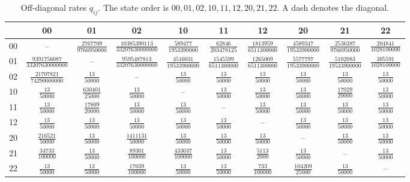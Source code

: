 \documentclass[11pt]{article}
\begin{document}
\begin{table}[ht]
\centering
\small
\setlength{\tabcolsep}{3.2pt}
\renewcommand{\arraystretch}{1.25}
\caption{Off-diagonal rates $q_{ij}$.  The state order is
$00,01,02,10,11,12,20,21,22$.  A dash denotes the diagonal.}
\label{tab:Q}
\begin{tabular}{c|ccccccccc}
\toprule
 &00&01&02&10&11&12&20&21&22\\
\midrule
00 &--&$\frac{2767709}{9766950000}$&$\frac{10385390113}{33207630000000}$&$\frac{589477}{1953390000}$&$\frac{62846}{203478125}$&$\frac{1813959}{6511300000}$&$\frac{4589347}{19533900000}$&$\frac{2536387}{9766950000}$&$\frac{204841}{1028100000}$\\
01 &$\frac{9391756087}{33207630000000}$&--&$\frac{9595487813}{33207630000000}$&$\frac{4516031}{19533900000}$&$\frac{1545599}{6511300000}$&$\frac{1265009}{6511300000}$&$\frac{5577797}{19533900000}$&$\frac{5102083}{19533900000}$&$\frac{305591}{1028100000}$\\
02 &$\frac{21707821}{74290000000}$&$\frac{13}{50000}$&--&$\frac{13}{50000}$&$\frac{13}{50000}$&$\frac{13}{50000}$&$\frac{13}{50000}$&$\frac{13}{50000}$&$\frac{13}{50000}$\\
10 &$\frac{13}{50000}$&$\frac{630401}{25000}$&$\frac{13}{50000}$&--&$\frac{13}{50000}$&$\frac{13}{50000}$&$\frac{13}{50000}$&$\frac{17029}{20000}$&$\frac{13}{50000}$\\
11 &$\frac{13}{50000}$&$\frac{17809}{20000}$&$\frac{13}{50000}$&$\frac{13}{50000}$&--&$\frac{13}{50000}$&$\frac{13}{50000}$&$\frac{13}{50000}$&$\frac{13}{50000}$\\
12 &$\frac{13}{50000}$&$\frac{13}{50000}$&$\frac{13}{50000}$&$\frac{13}{50000}$&$\frac{13}{50000}$&--&$\frac{13}{50000}$&$\frac{13}{50000}$&$\frac{13}{50000}$\\
20 &$\frac{216521}{50000}$&$\frac{13}{50000}$&$\frac{1411131}{50000}$&$\frac{13}{50000}$&$\frac{13}{50000}$&$\frac{13}{50000}$&--&$\frac{13}{50000}$&$\frac{13}{50000}$\\
21 &$\frac{34733}{100000}$&$\frac{13}{50000}$&$\frac{89301}{100000}$&$\frac{433037}{100000}$&$\frac{13}{50000}$&$\frac{5113}{2000}$&$\frac{13}{50000}$&--&$\frac{13}{50000}$\\
22 &$\frac{13}{50000}$&$\frac{13}{50000}$&$\frac{17039}{100000}$&$\frac{13}{50000}$&$\frac{13}{50000}$&$\frac{733}{100000}$&$\frac{104209}{25000}$&$\frac{13}{50000}$&--\\
\bottomrule
\end{tabular}
\end{table}
\end{document}
